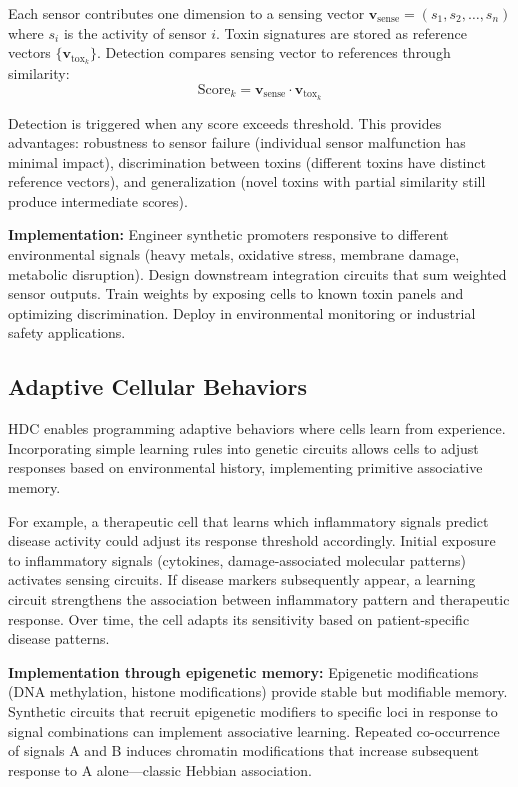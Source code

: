 \documentclass[12pt]{article}
\begin{document}
Each sensor contributes one dimension to a sensing vector $\mathbf{v}_{\text{sense}} = (s_1, s_2, \ldots, s_n)$ where $s_i$ is the activity of sensor $i$. Toxin signatures are stored as reference vectors $\{\mathbf{v}_{\text{tox}_k}\}$. Detection compares sensing vector to references through similarity:
\begin{equation}
\text{Score}_k = \mathbf{v}_{\text{sense}} \cdot \mathbf{v}_{\text{tox}_k}
\end{equation}

Detection is triggered when any score exceeds threshold. This provides advantages: robustness to sensor failure (individual sensor malfunction has minimal impact), discrimination between toxins (different toxins have distinct reference vectors), and generalization (novel toxins with partial similarity still produce intermediate scores).

\textbf{Implementation:} Engineer synthetic promoters responsive to different environmental signals (heavy metals, oxidative stress, membrane damage, metabolic disruption). Design downstream integration circuits that sum weighted sensor outputs. Train weights by exposing cells to known toxin panels and optimizing discrimination. Deploy in environmental monitoring or industrial safety applications.

\subsection{Adaptive Cellular Behaviors}

HDC enables programming adaptive behaviors where cells learn from experience. Incorporating simple learning rules into genetic circuits allows cells to adjust responses based on environmental history, implementing primitive associative memory.

For example, a therapeutic cell that learns which inflammatory signals predict disease activity could adjust its response threshold accordingly. Initial exposure to inflammatory signals (cytokines, damage-associated molecular patterns) activates sensing circuits. If disease markers subsequently appear, a learning circuit strengthens the association between inflammatory pattern and therapeutic response. Over time, the cell adapts its sensitivity based on patient-specific disease patterns.

\textbf{Implementation through epigenetic memory:} Epigenetic modifications (DNA methylation, histone modifications) provide stable but modifiable memory. Synthetic circuits that recruit epigenetic modifiers to specific loci in response to signal combinations can implement associative learning. Repeated co-occurrence of signals A and B induces chromatin modifications that increase subsequent response to A alone—classic Hebbian association.
\end{document}
